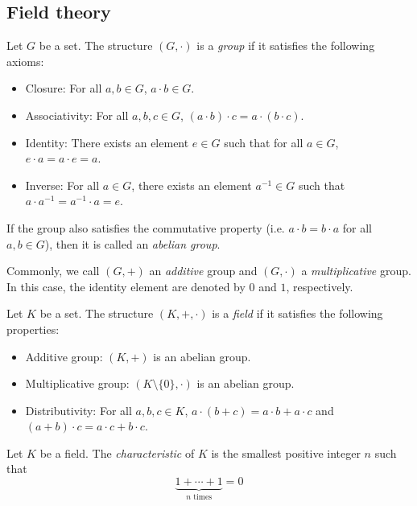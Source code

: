 \subsection{Field theory}
\begin{definition}[Group]
    Let $G$ be a set. The structure $(G, \cdot)$ is a \emph{group} if it satisfies the following axioms:
    \begin{itemize}
        \item Closure: For all $a, b \in G$, $a \cdot b \in G$.
        \item Associativity: For all $a, b, c \in G$, $(a \cdot b) \cdot c = a \cdot (b \cdot c)$.
        \item Identity: There exists an element $e \in G$ such that for all $a \in G$, $e \cdot a = a \cdot e = a$.
        \item Inverse: For all $a \in G$, there exists an element $a^{-1} \in G$ such that $a \cdot a^{-1} = a^{-1} \cdot a = e$.
    \end{itemize}
    If the group also satisfies the commutative property (i.e. $a \cdot b = b \cdot a$ for all $a, b \in G$), then it is called an \emph{abelian group}.
\end{definition}
Commonly, we call $(G, +)$ an \emph{additive} group and $(G, \cdot)$ a \emph{multiplicative} group. In this case, the identity element are denoted by $0$ and $1$, respectively.

\begin{definition}[Field]
    Let $K$ be a set. The structure $(K, +, \cdot)$ is a \emph{field} if it satisfies the following properties:
    \begin{itemize}
        \item Additive group: $(K, +)$ is an abelian group.
        \item Multiplicative group: $(K\setminus\{0\}, \cdot)$ is an abelian group.
        \item Distributivity: For all $a, b, c \in K$, $a \cdot (b + c) = a \cdot b + a \cdot c$ and $(a + b) \cdot c = a \cdot c + b \cdot c$.
    \end{itemize}
\end{definition}

\begin{definition}[Characteristic]
    Let $K$ be a field. The \emph{characteristic} of $K$ is the smallest positive integer $n$ such that
    \begin{equation*}
        \underbrace{1 + \cdots + 1}_\text{$n$ times} = 0
    \end{equation*}
\end{definition}

